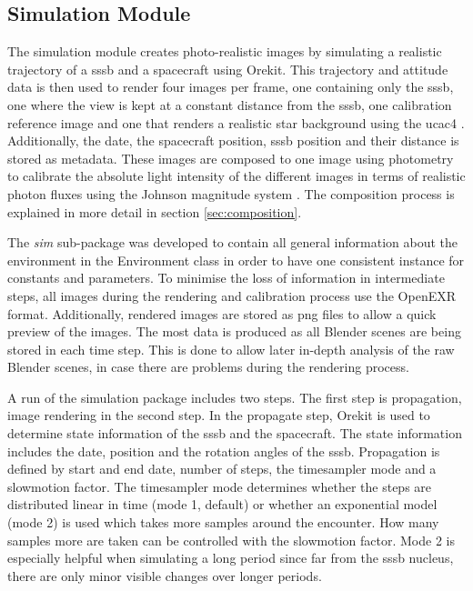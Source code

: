 \subsection{Simulation Module}
The simulation module creates photo-realistic images by simulating a realistic trajectory of a \gls{sssb} and a spacecraft using Orekit. This trajectory and attitude data is then used to render four images per frame, one containing only the \gls{sssb}, one where the view is kept at a constant distance from the \gls{sssb}, one calibration reference image and one that renders a realistic star background using the \gls{ucac4} \cite{zacharias2013fourthUCAC4}. Additionally, the date, the spacecraft position, \gls{sssb} position and their distance is stored as metadata. These images are composed to one image using photometry to calibrate the absolute light intensity of the different images in terms of realistic photon fluxes using the Johnson magnitude system \cite{Bessell1979UBVRIPhotometry}. The composition process is explained in more detail in section \ref{sec:composition}.

The \textit{sim} sub-package was developed to contain all general information about the environment in the Environment class in order to have one consistent instance for constants and parameters. To minimise the loss of information in intermediate steps, all images during the rendering and calibration process use the OpenEXR format. Additionally, rendered images are stored as png files to allow a quick preview of the images. The most data is produced as all Blender scenes are being stored in each time step. This is done to allow later in-depth analysis of the raw Blender scenes, in case there are problems during the rendering process.

A run of the simulation package includes two steps. The first step is propagation, image rendering in the second step.
In the propagate step, Orekit is used to determine state information of the \gls{sssb} and the spacecraft. The state information includes the date, position and the rotation angles of the \gls{sssb}. Propagation is defined by start and end date, number of steps, the timesampler mode and a slowmotion factor.
The timesampler mode determines whether the steps are distributed linear in time (mode 1, default) or whether an exponential model (mode 2) is used which takes more samples around the encounter. How many samples more are taken can be controlled with the slowmotion factor. Mode 2 is especially helpful when simulating a long period since far from the \gls{sssb} nucleus, there are only minor visible changes over longer periods.

